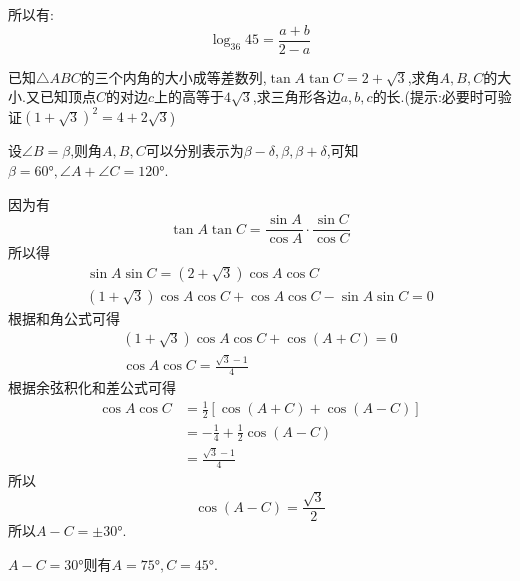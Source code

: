\begin{questions}
\begin{solution}
		所以有:
		\begin{equation*}
			\log_{36}{45} = \frac{a+b}{2-a}
		\end{equation*}

	\end{solution}

	\question[20] 已知$\triangle{ABC}$的三个内角的大小成等差数列,$\tan{A}\tan{C}=2+\sqrt{3}$,求角$A,B,C$的大小.又已知顶点$C$的对边$c$上的高等于$4\sqrt{3}$,求三角形各边$a,b,c$的长.(提示:必要时可验证$(1+\sqrt{3})^2=4+2\sqrt{3}$)

	\begin{solution}
		设$\angle{B}=\beta$,则角$A,B,C$可以分别表示为$\beta-\delta, \beta, \beta + \delta$,可知$\beta=\ang{60},
			\angle{A}+\angle{C} = \ang{120}$.

		因为有
		\begin{equation*}
			\tan{A}\tan{C}  = \frac{\sin{A}}{\cos{A}}\cdot\frac{\sin{C}}{\cos{C}}
		\end{equation*}
		所以得
		\begin{align*}
			\sin{A}\sin{C} = (2+\sqrt{3})\cos{A}\cos{C} \\
			(1+\sqrt{3})\cos{A}\cos{C} + \cos{A}\cos{C} - \sin{A}\sin{C} = 0
		\end{align*}
		根据和角公式可得
		\begin{align*}
			(1+\sqrt{3})\cos{A}\cos{C} + \cos(A+C)= 0 \\
			\cos{A}\cos{C} = \frac{\sqrt{3}-1}{4}
		\end{align*}
		根据余弦积化和差公式可得
		\begin{align*}
			\cos{A}\cos{C} & = \frac12[\cos(A+C)+\cos(A-C)] \\
			               & = -\frac14 + \frac12\cos(A-C)  \\
			               & = \frac{\sqrt{3}-1}{4}
		\end{align*}
		所以
		\begin{equation*}
			\cos(A-C) = \frac{\sqrt{3}}{2}
		\end{equation*}
		所以$A-C=\pm\ang{30}$.
		\begin{penum}
			\item $A-C=\ang{30}$则有$A=\ang{75}, C=\ang{45}$.
			      \begin{center}
\end{center}
\end{penum}
\end{solution}
\end{questions}
